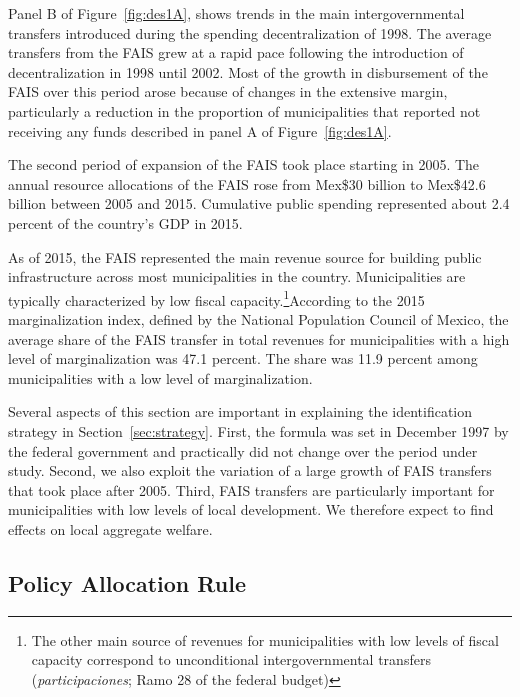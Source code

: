 \documentclass[dv_diss_main.tex]{subfiles}
\begin{document}
Panel B of Figure~\ref{fig:des1A}, shows trends in the main intergovernmental transfers introduced during the spending decentralization of 1998. The average transfers from the FAIS grew at a rapid pace following the introduction of decentralization in 1998 until 2002. Most of the growth in disbursement of the FAIS over this period arose because of changes in the extensive margin, particularly a reduction in the proportion of municipalities that reported not receiving any funds described in panel A of Figure~\ref{fig:des1A}.

The second period of expansion of the FAIS took place starting in 2005. The annual resource allocations of the FAIS rose from Mex\$30 billion to Mex\$42.6 billion between 2005 and 2015. Cumulative public spending represented about 2.4 percent of the country’s GDP in 2015.

As of 2015, the FAIS represented the main revenue source for building public infrastructure across most municipalities in the country. Municipalities are typically characterized by low fiscal capacity.\footnote{ The other main source of revenues for municipalities with low levels of fiscal capacity correspond to unconditional intergovernmental transfers (\textit{participaciones}; Ramo 28 of the federal budget)}According to the 2015 marginalization index, defined by the National Population Council of Mexico, the average share of the FAIS transfer in total revenues for municipalities with a high level of marginalization was 47.1 percent. The share was 11.9 percent among municipalities with a low level of marginalization.

Several aspects of this section are important in explaining the identification strategy in Section~\ref{sec:strategy}. First, the formula was set in December 1997 by the federal government and practically did not change over the period under study. Second, we also exploit the variation of a large growth of FAIS transfers that took place after 2005. Third, FAIS transfers are particularly important for municipalities with low levels of local development. We therefore expect to find effects on local aggregate welfare.



\subsection {Policy Allocation Rule } \label{subsec:Policy}
\end{document}

